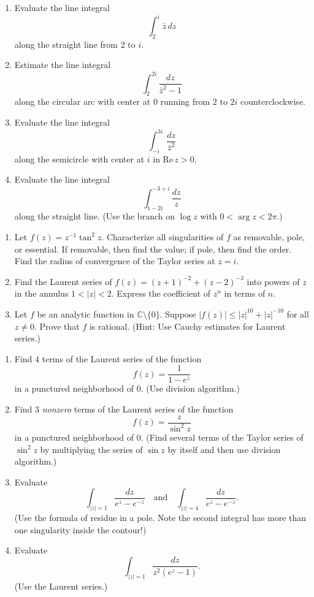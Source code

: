 \documentclass[12pt]{article}
\theoremstyle{definition} %
\theoremstyle{plain} %
\begin{document}
\begin{enumerate}
    \item Evaluate the line integral
    \[
    \int_2^i \bar{z} \, dz
    \]
    along the straight line from $2$ to $i$.

    \item Estimate the line integral
    \[
    \int_2^{2i} \frac{dz}{\bar{z}^2 - 1}
    \]
    along the circular arc with center at $0$ running from $2$ to $2i$ counterclockwise.

    \item Evaluate the line integral
    \[
    \int_{-i}^{3i} \frac{dz}{\bar{z}^2}
    \]
    along the semicircle with center at $i$ in $\text{Re}\, z > 0$.

    \item Evaluate the line integral
    \[
    \int_{1 - 2i}^{-3 + i} \frac{dz}{z}
    \]
    along the straight line. (Use the branch on $\log z$ with $0 < \arg z < 2\pi$.)
\end{enumerate}
\begin{enumerate}
    \item Let $f(z) = z^{-1} \tan^2 z$. Characterize all singularities of $f$ as removable, pole, or essential. If removable, then find the value; if pole, then find the order. Find the radius of convergence of the Taylor series at $z = i$.
    
    \setcounter{enumi}{2}
    
    \item Find the Laurent series of $f(z) = (z + 1)^{-2} + (z - 2)^{-3}$ into powers of $z$ in the annulus $1 < |z| < 2$. Express the coefficient of $z^n$ in terms of $n$.

    \item Let $f$ be an analytic function in $\mathbb{C} \setminus \{0\}$. Suppose $|f(z)| \le |z|^{10} + |z|^{-10}$ for all $z \ne 0$. Prove that $f$ is rational. (Hint: Use Cauchy estimates for Laurent series.)
\end{enumerate}
\begin{enumerate}
    \item Find 4 terms of the Laurent series of the function
    \[
    f(z) = \frac{1}{1 - e^z}
    \]
    in a punctured neighborhood of $0$. (Use division algorithm.)

    \item Find 3 \textit{nonzero} terms of the Laurent series of the function
    \[
    f(z) = \frac{z}{\sin^2 z}
    \]
    in a punctured neighborhood of $0$. (Find several terms of the Taylor series of $\sin^2 z$ by multiplying the series of $\sin z$ by itself and then use division algorithm.)

    \item Evaluate
    \[
    \int_{|z| = 1} \frac{dz}{e^z - e^{-z}} \quad \text{and} \quad \int_{|z| = 4} \frac{dz}{e^z - e^{-z}}.
    \]
    (Use the formula of residue in a pole. Note the second integral has more than one singularity inside the contour!)

    \item Evaluate
    \[
    \int_{|z| = 1} \frac{dz}{z^2 (e^z - 1)}.
    \]
    (Use the Laurent series.)
\end{enumerate}
\end{document}
